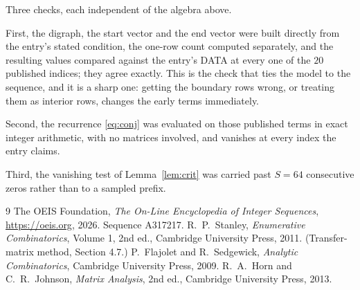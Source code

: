 \documentclass[11pt,a4paper]{article}
\theoremstyle{plain}
\theoremstyle{definition}
\begin{document}
Three checks, each independent of the algebra above.

First, the digraph, the start vector and the end vector were built directly from the
entry's stated condition, the one-row count computed separately, and the resulting values
compared against the entry's DATA at every one of the $20$ published indices; they
agree exactly. This is the check that ties the model to the sequence, and it is a sharp one:
getting the boundary rows wrong, or treating them as interior rows, changes the early terms
immediately.

Second, the recurrence \eqref{eq:conj} was evaluated on those published terms in exact
integer arithmetic, with no matrices involved, and vanishes at every index the entry claims.

Third, the vanishing test of Lemma~\ref{lem:crit} was carried past $S=64$ consecutive
zeros rather than to a sampled prefix.

\begin{thebibliography}{9}
 The OEIS Foundation, \emph{The On-Line Encyclopedia of Integer
Sequences}, \url{https://oeis.org}, 2026. Sequence A317217.
 R.~P.~Stanley, \emph{Enumerative Combinatorics}, Volume 1, 2nd ed.,
Cambridge University Press, 2011. (Transfer-matrix method, Section 4.7.)
 P.~Flajolet and R.~Sedgewick, \emph{Analytic Combinatorics}, Cambridge
University Press, 2009.
 R.~A.~Horn and C.~R.~Johnson, \emph{Matrix Analysis}, 2nd ed., Cambridge
University Press, 2013.
\end{thebibliography}
\end{document}
